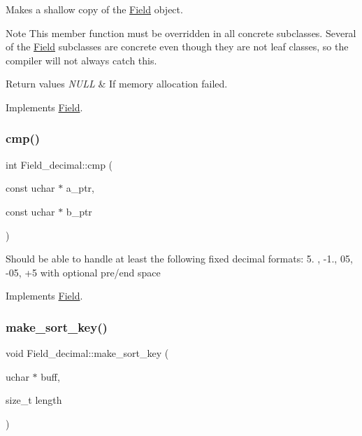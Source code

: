 Makes a shallow copy of the \mbox{\hyperlink{classField}{Field}} object.

\begin{DoxyNote}{Note}
This member function must be overridden in all concrete subclasses. Several of the \mbox{\hyperlink{classField}{Field}} subclasses are concrete even though they are not leaf classes, so the compiler will not always catch this.
\end{DoxyNote}

\begin{DoxyRetVals}{Return values}
{\em N\+U\+LL} & If memory allocation failed. \\
\hline
\end{DoxyRetVals}


Implements \mbox{\hyperlink{classField_a01a9a9aa3a618941e839b1b8793c969d}{Field}}.

\mbox{\label{classField__decimal_ab82c27bf2bef656e8ba820be255262d1}} 
\subsubsection{\texorpdfstring{cmp()}{cmp()}}
{\footnotesize\ttfamily int Field\+\_\+decimal\+::cmp (\begin{DoxyParamCaption}\item[{const uchar $\ast$}]{a\+\_\+ptr,  }\item[{const uchar $\ast$}]{b\+\_\+ptr }\end{DoxyParamCaption})\hspace{0.3cm}{\ttfamily [virtual]}}

Should be able to handle at least the following fixed decimal formats\+: 5. , -\/1., 05, -\/05, +5 with optional pre/end space 

Implements \mbox{\hyperlink{classField}{Field}}.

\mbox{\label{classField__decimal_aa1510cbae7dff99eb2a804dd988ed6f0}} 
\subsubsection{\texorpdfstring{make\+\_\+sort\+\_\+key()}{make\_sort\_key()}}
{\footnotesize\ttfamily void Field\+\_\+decimal\+::make\+\_\+sort\+\_\+key (\begin{DoxyParamCaption}\item[{uchar $\ast$}]{buff,  }\item[{size\+\_\+t}]{length }\end{DoxyParamCaption})\hspace{0.3cm}{\ttfamily [virtual]}}

